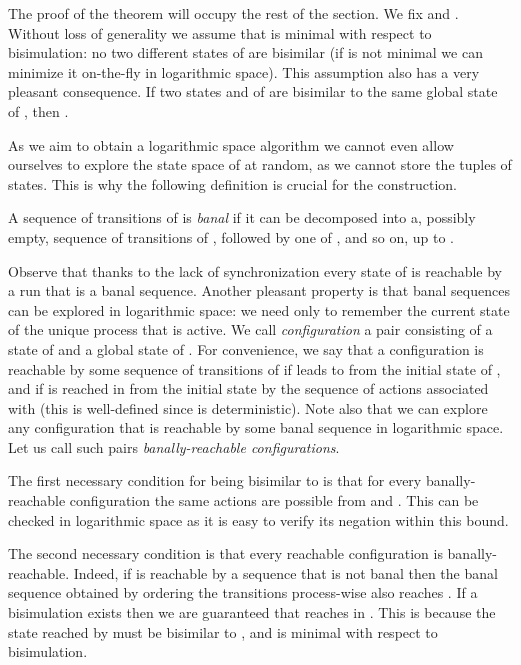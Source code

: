 \documentclass{LMCS}
\theoremstyle{plain}\newtheorem{remark}{Remark}
\theoremstyle{plain}\newtheorem{lemma}[thm]{Lemma}
\begin{document}
The proof of the theorem will occupy the rest of the section. We fix
 and . Without loss of generality we assume
that  is minimal with respect to bisimulation: no two different
states of  are bisimilar (if  is not minimal we can
minimize it on-the-fly in logarithmic space).  This
assumption also has a very pleasant consequence. If two states 
and  of  are bisimilar to the same global state of ,
then .

As we aim to obtain a logarithmic space algorithm we cannot even allow
ourselves to explore the state space of  at random, as we cannot
store the tuples of states. This is why the following definition is
crucial for the construction.

\begin{defi}
  A sequence of transitions of  is
  \emph{banal} if it can be decomposed into a, possibly empty,
  sequence of transitions of , followed by one of ,
  and so on, up to .
\end{defi}

Observe that thanks to the lack of synchronization every state of
 is reachable by a run that is a banal sequence. Another
pleasant property is that banal sequences can be explored in
logarithmic space: we need only to remember the current state of the
unique process that is active. We call \emph{configuration} a pair
 consisting of a state  of  and a global state  of
. For convenience, we say that a configuration  is
reachable by some sequence  of transitions of  if  leads
to  from the initial state of , and if  is reached 
in  from the initial state by the sequence of actions associated
with  (this is well-defined since  is deterministic).  Note
also that we can explore any configuration
 that is reachable by some banal sequence in
logarithmic space.  Let us call such pairs \emph{banally-reachable
  configurations}.

The first necessary condition for  being bisimilar to
 is that for every banally-reachable
configuration  the same actions are possible from  and
. This can be checked in logarithmic space as it is  easy to
verify its negation within this bound.

The second necessary condition is that every reachable configuration
is banally-reachable. Indeed, if  is reachable by a
sequence that is not banal then the banal sequence  obtained by
ordering the transitions process-wise also reaches
. If a bisimulation exists then we are
guaranteed that  reaches  in .  This is because the state
reached by  must be bisimilar to , and  is minimal with
respect to bisimulation.
\end{document}
